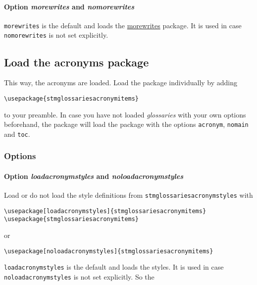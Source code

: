 \documentclass{scrartcl}
\begin{document}
\paragraph{Option \protect\textit{morewrites} and \protect\textit{nomorewrites}}

\texttt{morewrites} is the default and loads the \href{https://ctan.org/pkg/morewrites?lang=en}{morewrites} package. It is used in case \texttt{nomorewrites} is not set explicitly.

\subsection{Load the acronyms package}
\label{sec:usage:preamble:acronymspackage}

This way, the acronyms are loaded. Load the package individually by adding

\begin{verbatim}
\usepackage{stmglossariesacronymitems}
\end{verbatim}

to your preamble. In case you have not loaded \textit{glossaries} with your own options beforehand, the package will load the package with the options \texttt{acronym}, \texttt{nomain} and \texttt{toc}.

\subsubsection{Options}

\paragraph{Option \protect\textit{loadacronymstyles} and \protect\textit{noloadacronymstyles}}

Load or do not load the style definitions from \texttt{stmglossariesacronymstyles} with

\begin{verbatim}
\usepackage[loadacronymstyles]{stmglossariesacronymitems}
\usepackage{stmglossariesacronymitems}
\end{verbatim}

or

\begin{verbatim}
\usepackage[noloadacronymstyles]{stmglossariesacronymitems}
\end{verbatim}

\texttt{loadacronymstyles} is the default and loads the styles. It is used in case \texttt{noloadacronymstyles} is not set explicitly. So the 
\end{document}
